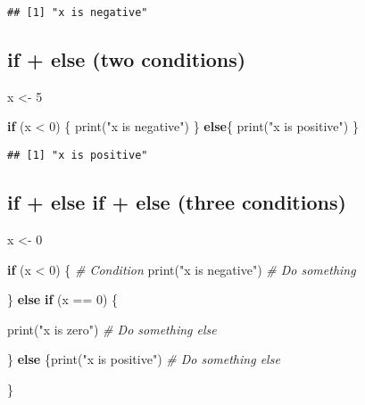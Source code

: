 \documentclass[
]{book}
\newenvironment{Shaded}{\begin{snugshade}}{\end{snugshade}}
\newcommand{\CommentTok}[1]{\textcolor[rgb]{0.56,0.35,0.01}{\textit{#1}}}
\newcommand{\ControlFlowTok}[1]{\textcolor[rgb]{0.13,0.29,0.53}{\textbf{#1}}}
\newcommand{\DecValTok}[1]{\textcolor[rgb]{0.00,0.00,0.81}{#1}}
\newcommand{\FunctionTok}[1]{\textcolor[rgb]{0.00,0.00,0.00}{#1}}
\newcommand{\NormalTok}[1]{#1}
\newcommand{\OtherTok}[1]{\textcolor[rgb]{0.56,0.35,0.01}{#1}}
\newcommand{\SpecialCharTok}[1]{\textcolor[rgb]{0.00,0.00,0.00}{#1}}
\newcommand{\StringTok}[1]{\textcolor[rgb]{0.31,0.60,0.02}{#1}}
\begin{document}
\begin{verbatim}
## [1] "x is negative"
\end{verbatim}

\hypertarget{if-else-two-conditions}{%
\subsection{if + else (two conditions)}\label{if-else-two-conditions}}

\begin{Shaded}
\begin{Highlighting}[]
\NormalTok{x }\OtherTok{\textless{}{-}} \DecValTok{5}

\ControlFlowTok{if}\NormalTok{ (x }\SpecialCharTok{\textless{}} \DecValTok{0}\NormalTok{) \{}
  \FunctionTok{print}\NormalTok{(}\StringTok{"x is negative"}\NormalTok{)}
\NormalTok{\} }\ControlFlowTok{else}\NormalTok{\{}
  \FunctionTok{print}\NormalTok{(}\StringTok{"x is positive"}\NormalTok{)}
\NormalTok{\}}
\end{Highlighting}
\end{Shaded}

\begin{verbatim}
## [1] "x is positive"
\end{verbatim}

\hypertarget{if-else-if-else-three-conditions}{%
\subsection{if + else if + else (three conditions)}\label{if-else-if-else-three-conditions}}

\begin{Shaded}
\begin{Highlighting}[]
\NormalTok{x }\OtherTok{\textless{}{-}} \DecValTok{0}

\ControlFlowTok{if}\NormalTok{ (x }\SpecialCharTok{\textless{}} \DecValTok{0}\NormalTok{) \{ }\CommentTok{\# Condition }
  \FunctionTok{print}\NormalTok{(}\StringTok{"x is negative"}\NormalTok{) }\CommentTok{\# Do something }

\NormalTok{  \} }\ControlFlowTok{else} \ControlFlowTok{if}\NormalTok{ (x }\SpecialCharTok{==} \DecValTok{0}\NormalTok{) \{ }
  
    \FunctionTok{print}\NormalTok{(}\StringTok{"x is zero"}\NormalTok{) }\CommentTok{\# Do something else }

\NormalTok{    \} }\ControlFlowTok{else}\NormalTok{ \{}\FunctionTok{print}\NormalTok{(}\StringTok{"x is positive"}\NormalTok{) }\CommentTok{\# Do something else }

\NormalTok{      \}}
\end{Highlighting}
\end{Shaded}
\end{document}
